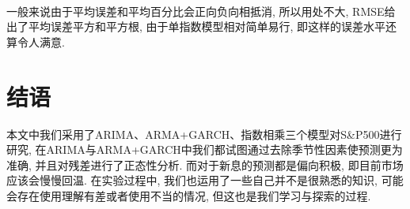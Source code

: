 \documentclass[12pt]{article}
\begin{document}
\ 

\qquad 一般来说由于平均误差和平均百分比会正向负向相抵消, 所以用处不大, RMSE给出了平均误差平方和平方根, 由于单指数模型相对简单易行, 即这样的误差水平还算令人满意. 
\section{结语}
\qquad 本文中我们采用了ARIMA、ARMA+GARCH、指数相乘三个模型对S\&P500进行研究, 在ARIMA与ARMA+GARCH中我们都试图通过去除季节性因素使预测更为准确, 并且对残差进行了正态性分析. 而对于新息的预测都是偏向积极, 即目前市场应该会慢慢回温. 在实验过程中, 我们也运用了一些自己并不是很熟悉的知识, 可能会存在使用理解有差或者使用不当的情况, 但这也是我们学习与探索的过程. 










































\newpage
\nocite{*}


\newpage
\appendix
\end{document}
